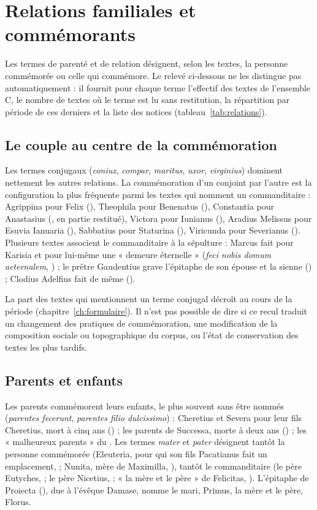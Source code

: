 \chapter{Relations familiales et commémorants}\label{ch:relations}

Les termes de parenté et de relation désignent, selon les textes, la personne commémorée ou celle qui commémore. Le relevé ci-dessous ne les distingue pas automatiquement : il fournit pour chaque terme l’effectif des textes de l’ensemble C, le nombre de textes où le terme est lu sans restitution, la répartition par période de ces derniers et la liste des notices (tableau~\ref{tab:relations}).



\section{Le couple au centre de la commémoration}

Les termes conjugaux (\emph{coniux}, \emph{compar}, \emph{maritus}, \emph{uxor}, \emph{virginius}) dominent nettement les autres relations. La commémoration d’un conjoint par l’autre est la configuration la plus fréquente parmi les textes qui nomment un commanditaire : Agrippina pour Felix (), Theophila pour Benenatus (), Constantia pour Anastasius (, en partie restitué), Victora pour Iunianus (), Aradius Melissus pour Esuvia Ianuaria (), Sabbatius pour Staturina (), Viricunda pour Severianus (). Plusieurs textes associent le commanditaire à la sépulture : Marcus fait pour Karisia et pour lui-même une « demeure éternelle » (\emph{feci nobis domum aeternalem}, ) ; le prêtre Gaudentius grave l’épitaphe de son épouse et la sienne () ; Clodius Adelfius fait de même ().

La part des textes qui mentionnent un terme conjugal décroît au cours de la période (chapitre~\ref{ch:formulaire}). Il n’est pas possible de dire si ce recul traduit un changement des pratiques de commémoration, une modification de la composition sociale ou topographique du corpus, ou l’état de conservation des textes les plus tardifs.

\section{Parents et enfants}

Les parents commémorent leurs enfants, le plus souvent sans être nommés (\emph{parentes fecerunt}, \emph{parentes filio dulcissimo}) : Cheretius et Severa pour leur fils Cheretius, mort à cinq ans () ; les parents de Successa, morte à deux ans () ; les « malheureux parents » du . Les termes \emph{mater} et \emph{pater} désignent tantôt la personne commémorée (Eleuteria, pour qui son fils Pacatianus fait un emplacement,  ; Nunita, mère de Maximilla, ), tantôt le commanditaire (le père Eutyches,  ; le père Nicetius,  ; « la mère et le père » de Felicitas, ). L’épitaphe de Proiecta (), due à l’évêque Damase, nomme le mari, Primus, la mère et le père, Florus.

